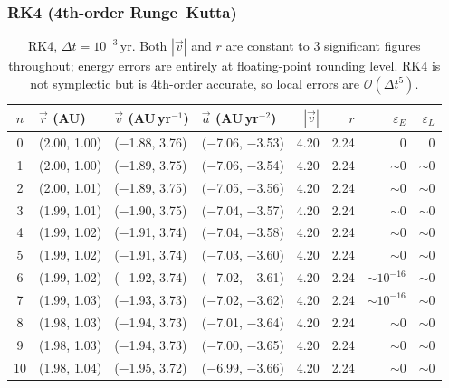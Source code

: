 \subsubsection*{RK4 (4th-order Runge--Kutta)}

\begin{table}[H]
    \centering
    \scriptsize
    \setlength{\tabcolsep}{4pt}
    \begin{tabular}{c l l l r r r r}
        \hline
        $n$ & $\vec{r}$ (AU) & $\vec{v}$ (AU\,yr$^{-1}$) & $\vec{a}$ (AU\,yr$^{-2}$) & $|\vec{v}|$ & $r$ & $\varepsilon_E$ & $\varepsilon_L$ \\
        \hline
        0  & (2.00, 1.00) & ($-$1.88, 3.76)  & ($-$7.06, $-$3.53) & 4.20 & 2.24 & $0$ & $0$ \\
        1  & (2.00, 1.00) & ($-$1.89, 3.75)  & ($-$7.06, $-$3.54) & 4.20 & 2.24 & $\sim\!0$ & $\sim\!0$ \\
        2  & (2.00, 1.01) & ($-$1.89, 3.75)  & ($-$7.05, $-$3.56) & 4.20 & 2.24 & $\sim\!0$ & $\sim\!0$ \\
        3  & (1.99, 1.01) & ($-$1.90, 3.75)  & ($-$7.04, $-$3.57) & 4.20 & 2.24 & $\sim\!0$ & $\sim\!0$ \\
        4  & (1.99, 1.02) & ($-$1.91, 3.74)  & ($-$7.04, $-$3.58) & 4.20 & 2.24 & $\sim\!0$ & $\sim\!0$ \\
        5  & (1.99, 1.02) & ($-$1.91, 3.74)  & ($-$7.03, $-$3.60) & 4.20 & 2.24 & $\sim\!0$ & $\sim\!0$ \\
        6  & (1.99, 1.02) & ($-$1.92, 3.74)  & ($-$7.02, $-$3.61) & 4.20 & 2.24 & $\sim\!10^{-16}$ & $\sim\!0$ \\
        7  & (1.99, 1.03) & ($-$1.93, 3.73)  & ($-$7.02, $-$3.62) & 4.20 & 2.24 & $\sim\!10^{-16}$ & $\sim\!0$ \\
        8  & (1.98, 1.03) & ($-$1.94, 3.73)  & ($-$7.01, $-$3.64) & 4.20 & 2.24 & $\sim\!0$ & $\sim\!0$ \\
        9  & (1.98, 1.03) & ($-$1.94, 3.73)  & ($-$7.00, $-$3.65) & 4.20 & 2.24 & $\sim\!0$ & $\sim\!0$ \\
        10 & (1.98, 1.04) & ($-$1.95, 3.72)  & ($-$6.99, $-$3.66) & 4.20 & 2.24 & $\sim\!0$ & $\sim\!0$ \\
        \hline
    \end{tabular}
    \caption{RK4, $\Delta t = 10^{-3}$\,yr. Both $|\vec{v}|$ and $r$ are constant to 3 significant figures throughout; energy errors are entirely at floating-point rounding level. RK4 is not symplectic but is 4th-order accurate, so local errors are $\mathcal{O}(\Delta t^5)$.}
\end{table}

